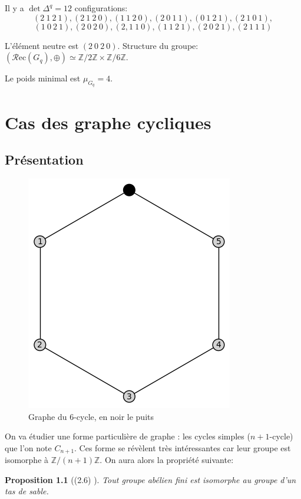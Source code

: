 \documentclass{report}
\newtheorem{property}[theorem]{Proposition}
\newcommand{\recu}[1]{\ensuremath{\mathcal{R}\text{ec}(#1)}}
\newcommand{\poidsmin}[1]{\ensuremath{\mu_{#1}}}
\newcommand{\plus}{\ensuremath{\oplus}}
\begin{document}
Il y a $\det \Delta^q = 12$ configurations:
$$\left(2\ 1\ 2\ 1\right), \left(2\ 1\ 2\ 0\right), \left(1\ 1\ 2\ 0\right), \left(2\ 0\ 1\ 1\right), \left(0\ 1\ 2\ 1\right), \left(2\ 1\ 0\ 1\right),$$ 
$$\left(1\ 0\ 2\ 1\right), \left(2\ 0\ 2\ 0\right), \left(2,1\ 1\ 0\right), \left(1\ 1\ 2\ 1\right), \left(2\ 0\ 2\ 1\right), \left(2\ 1\ 1\ 1\right)$$

L'élément neutre est $(2\ 0\ 2\ 0)$.
Structure du groupe: $(\recu{G_q}, \plus) \simeq  \mathbb{Z}/2\mathbb{Z} \times \mathbb{Z}/6\mathbb{Z}$.

Le poids minimal est $\poidsmin{G_q} = 4$.



\chapter{Cas des graphe cycliques}
\section{Présentation}
\begin{figure}[h]
\centering\includegraphics[scale=1]{6_cycle.png}
\caption{Graphe du 6-cycle, en noir le puits}
\label{6cycle}
\end{figure}
On va étudier une forme particulière de graphe : les cycles simples ($n+1$-cycle) que l'on note $C_{n+1}$.
Ces forme se révèlent très intéressantes car leur groupe est isomorphe à $\mathbb{Z}/(n+1)\mathbb{Z}$. On aura alors la propriété suivante:

\begin{property}[(2.6) \cite{thPoly}]
Tout groupe abélien fini est isomorphe au groupe d'un tas de sable.
\end{property}
\end{document}
